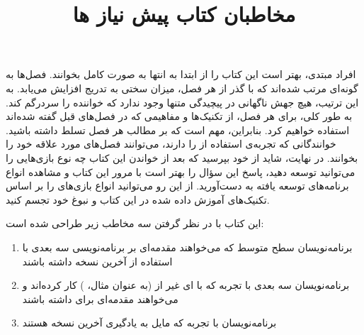 {
    \Large
    \begin{spacing}{1.5}
        افراد مبتدی، بهتر است این کتاب را از ابتدا به انتها به صورت کامل بخوانند. فصل‌ها به گونه‌ای مرتب شده‌اند که با گذر از هر فصل، میزان سختی به تدریج افزایش می‌یابد. به این ترتیب، هیچ جهش ناگهانی در پیچیدگی متنها وجود ندارد که خواننده را سردرگم کند.
        به طور کلی، برای هر فصل، از تکنیک‌ها و مفاهیمی که در فصل‌های قبل گفته شده‌اند استفاده خواهیم کرد. بنابراین، مهم است که بر مطالب هر فصل تسلط داشته باشید.
        خوانندگانی که تجربه‌ی استفاده از  را دارند، می‌توانند فصل‌های مورد علاقه خود را بخوانند. در نهایت، شاید از خود بپرسید که بعد از خواندن این کتاب چه نوع بازی‌هایی را می‌توانید توسعه دهید، پاسخ این سؤال را بهتر است با مرور این کتاب و مشاهده انواع برنامه‌های توسعه یافته به دست‌آورید.
        از این رو می‌توانید انواع بازی‌های را بر اساس تکنیک‌های آموزش داده شده در این کتاب و نبوغ خود تجسم کنید.
    \end{spacing}
}

\newpage

\title{
    \huge
    \hspace{-40pt}
    \textbf{مخاطبان کتاب}
}  \rullFillWithLine[0.5em]{1pt}
\textbf{\vspace{7pt}}

{
    \Large
    این کتاب با در نظر گرفتن سه مخاطب زیر طراحی شده است:
    \begin{enumerate}
        \item {برنامه‌نویسان سطح متوسط  که می‌خواهند مقدمه‌ای بر برنامه‌نویسی سه بعدی با استفاده از آخرین نسخه  داشته باشند}
        \item {برنامه‌نویسان سه بعدی با تجربه که با ‌ای غیر از  (به عنوان مثال، ) کار کرده‌اند و می‌خواهند مقدمه‌ای برای  داشته باشند}
        \item {برنامه‌نویسان با تجربه  که مایل به یادگیری آخرین نسخه  هستند}
    \end{enumerate}
}
\textbf{\vspace{10pt}}

\title{
    \huge
    \hspace{-40pt}
    \textbf{پیش نیاز ها}
}  \rullFillWithLine[0.5em]{1pt}
\textbf{\vspace{7pt}}

